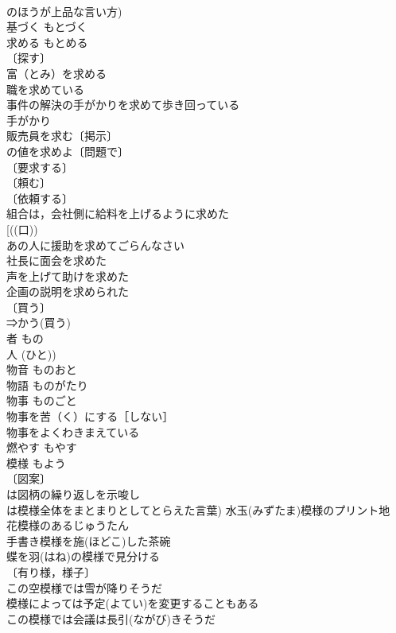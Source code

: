 \documentclass[8pt]{extreport}
\begin{document}
\begin{CJK}{UTF8}{min}
\\	のほうが上品な言い方)
\\	基づく	もとづく	
\\	求める	もとめる	
\\	〔探す〕
\\	富（とみ）を求める 
\\	職を求めている 
\\	事件の解決の手がかりを求めて歩き回っている 
\\	手がかり　
\\	販売員を求む〔掲示〕 
\\	の値を求めよ〔問題で〕 
\\	〔要求する〕
\\	〔頼む〕
\\	〔依頼する〕
\\	組合は，会社側に給料を上げるように求めた 
\\	[((口)) 
\\	あの人に援助を求めてごらんなさい 
\\	社長に面会を求めた 
\\	声を上げて助けを求めた 
\\	企画の説明を求められた 
\\	〔買う〕
\\	⇒かう(買う)
\\	者	もの	
\\	人 (ひと))
\\	物音	ものおと	
\\	物語	ものがたり	
\\	物事	ものごと	
\\	物事を苦（く）にする［しない］ 
\\	物事をよくわきまえている 
\\	燃やす	もやす	
\\	模様	もよう	
\\	〔図案〕
\\	は図柄の繰り返しを示唆し
\\	は模様全体をまとまりとしてとらえた言葉) 水玉(みずたま)模様のプリント地 
\\	花模様のあるじゅうたん 
\\	手書き模様を施(ほどこ)した茶碗 
\\	蝶を羽(はね)の模様で見分ける 
\\	〔有り様，様子〕
\\	この空模様では雪が降りそうだ 
\\	模様によっては予定(よてい)を変更することもある 
\\	この模様では会議は長引(ながび)きそうだ 

\end{CJK}
\end{document}
